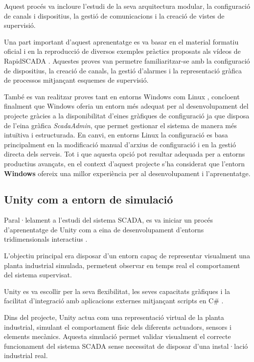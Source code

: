 \documentclass[a4paper,11pt,DIV=13,headings=normal,abstract=true,twoside=semi]{article}
\begin{document}
Aquest procés va incloure l'estudi de la seva arquitectura modular, la configuració de canals i dispositius, la gestió de comunicacions i la creació de vistes de supervisió.

Una part important d'aquest aprenentatge es va basar en el material formatiu oficial i en la reproducció de diversos exemples pràctics proposats als vídeos de RapidSCADA \cite{RapidScadaVideos}. Aquestes proves van permetre familiaritzar-se amb la configuració de dispositius, la creació de canals, la gestió d'alarmes i la representació gràfica de processos mitjançant esquemes de supervisió.


També es van realitzar proves tant en entorns Windows com Linux \cite{rapidscada_windows_install,rapidscada_linux_install}, concloent finalment que Windows oferia un entorn més adequat per al desenvolupament del projecte gràcies a la disponibilitat d'eines gràfiques de configuració ja que disposa de l'eina gràfica 	\textit{ScadaAdmin}, que permet gestionar el sistema de manera més intuïtiva i estructurada. En canvi, en entorns Linux la configuració es basa principalment en la modificació manual d'arxius de configuració i en la gestió directa dels serveis. Tot i que aquesta opció pot resultar adequada per a entorns productius avançats, en el context d'aquest projecte s'ha considerat que l'entorn \textbf{Windows} ofereix una millor experiència per al desenvolupament i l'aprenentatge.


\subsection{Unity com a entorn de simulació}
\label{sec:unity_research}

Paral·lelament a l'estudi del sistema SCADA, es va iniciar un procés d'aprenentatge de Unity com a eina de desenvolupament d'entorns tridimensionals interactius \cite{Unity,UnityOfficial}.

L'objectiu principal era disposar d'un entorn capaç de representar visualment una planta industrial simulada, permetent observar en temps real el comportament del sistema supervisat.

Unity es va escollir per la seva flexibilitat, les seves capacitats gràfiques i la facilitat d'integració amb aplicacions externes mitjançant scripts en C\# \cite{UnityProgrammingGuide}.

Dins del projecte, Unity actua com una representació virtual de la planta industrial, simulant el comportament físic dels diferents actuadors, sensors i elements mecànics. Aquesta simulació permet validar visualment el correcte funcionament del sistema SCADA sense necessitat de disposar d'una instal·lació industrial real.
\end{document}
